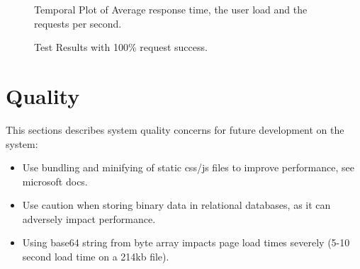 \documentclass[11pt]{article}
\begin{document}
\begin{figure}[H]
	\caption{Temporal Plot of Average response time, the user load and the requests per second.}
\end{figure}
\begin{figure}[H]
	\caption{Test Results with 100\% request success.}
\end{figure}
\section{Quality}
This sections describes system quality concerns for future development on the system:
\begin{itemize}
	\item Use bundling and minifying of static css/js files to improve performance, see microsoft docs.
	\item Use caution when storing binary data in relational databases, as it can adversely impact performance.
	\item Using base64 string from byte array impacts page load times severely (5-10 second load time on a 214kb file). 
	
\end{itemize}
\end{document}
